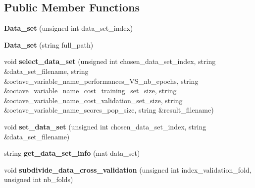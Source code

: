 \subsection*{Public Member Functions}
\begin{DoxyCompactItemize}
\item 
\hypertarget{classData__set_af0f3dbdff54b11ac32673376bae08496}{{\bfseries Data\-\_\-set} (unsigned int data\-\_\-set\-\_\-index)}\label{classData__set_af0f3dbdff54b11ac32673376bae08496}

\item 
\hypertarget{classData__set_a92c3a43a0975eb21124e7bcc97929e0a}{{\bfseries Data\-\_\-set} (string full\-\_\-path)}\label{classData__set_a92c3a43a0975eb21124e7bcc97929e0a}

\item 
\hypertarget{classData__set_aa7248d572372d35290301b9b99430e3e}{void {\bfseries select\-\_\-data\-\_\-set} (unsigned int chosen\-\_\-data\-\_\-set\-\_\-index, string \&data\-\_\-set\-\_\-filename, string \&octave\-\_\-variable\-\_\-name\-\_\-performances\-\_\-\-V\-S\-\_\-nb\-\_\-epochs, string \&octave\-\_\-variable\-\_\-name\-\_\-cost\-\_\-training\-\_\-set\-\_\-size, string \&octave\-\_\-variable\-\_\-name\-\_\-cost\-\_\-validation\-\_\-set\-\_\-size, string \&octave\-\_\-variable\-\_\-name\-\_\-scores\-\_\-pop\-\_\-size, string \&result\-\_\-filename)}\label{classData__set_aa7248d572372d35290301b9b99430e3e}

\item 
\hypertarget{classData__set_aa432606c593fd250c0a0ab609b66e444}{void {\bfseries set\-\_\-data\-\_\-set} (unsigned int chosen\-\_\-data\-\_\-set\-\_\-index, string \&data\-\_\-set\-\_\-filename)}\label{classData__set_aa432606c593fd250c0a0ab609b66e444}

\item 
\hypertarget{classData__set_ac7a6c8ad0589a66b22f60eb060bb78ea}{string {\bfseries get\-\_\-data\-\_\-set\-\_\-info} (mat data\-\_\-set)}\label{classData__set_ac7a6c8ad0589a66b22f60eb060bb78ea}

\item 
\hypertarget{classData__set_a349e7a0dde59198defde4ac0776417d6}{void {\bfseries subdivide\-\_\-data\-\_\-cross\-\_\-validation} (unsigned int index\-\_\-validation\-\_\-fold, unsigned int nb\-\_\-folds)}\label{classData__set_a349e7a0dde59198defde4ac0776417d6}

\end{DoxyCompactItemize}
